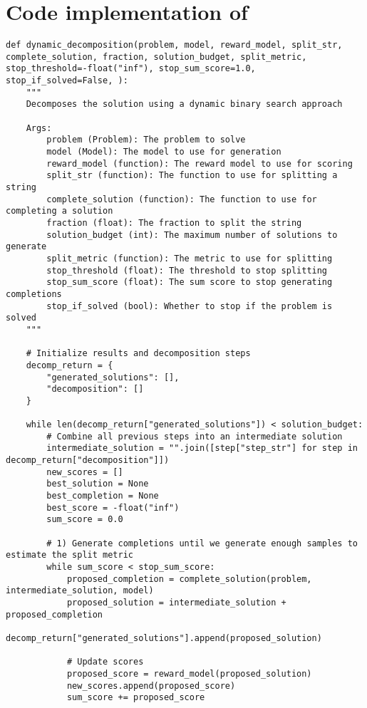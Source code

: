 \section{Code implementation of \decomp}
\label{app:code_impl}
\begin{tcolorbox}[colback=white, title=Python implementation of \decomp]
    \begin{lstlisting}
def dynamic_decomposition(problem, model, reward_model, split_str, complete_solution, fraction, solution_budget, split_metric, stop_threshold=-float("inf"), stop_sum_score=1.0, stop_if_solved=False, ):
    """
    Decomposes the solution using a dynamic binary search approach

    Args:
        problem (Problem): The problem to solve
        model (Model): The model to use for generation
        reward_model (function): The reward model to use for scoring
        split_str (function): The function to use for splitting a string
        complete_solution (function): The function to use for completing a solution
        fraction (float): The fraction to split the string
        solution_budget (int): The maximum number of solutions to generate
        split_metric (function): The metric to use for splitting
        stop_threshold (float): The threshold to stop splitting
        stop_sum_score (float): The sum score to stop generating completions
        stop_if_solved (bool): Whether to stop if the problem is solved
    """

    # Initialize results and decomposition steps
    decomp_return = {
        "generated_solutions": [],
        "decomposition": []
    }

    while len(decomp_return["generated_solutions"]) < solution_budget:
        # Combine all previous steps into an intermediate solution
        intermediate_solution = "".join([step["step_str"] for step in decomp_return["decomposition"]])
        new_scores = []
        best_solution = None
        best_completion = None
        best_score = -float("inf")
        sum_score = 0.0

        # 1) Generate completions until we generate enough samples to estimate the split metric
        while sum_score < stop_sum_score:
            proposed_completion = complete_solution(problem, intermediate_solution, model)
            proposed_solution = intermediate_solution + proposed_completion
            decomp_return["generated_solutions"].append(proposed_solution)

            # Update scores
            proposed_score = reward_model(proposed_solution)
            new_scores.append(proposed_score)
            sum_score += proposed_score


\end{lstlisting}
\end{tcolorbox}
